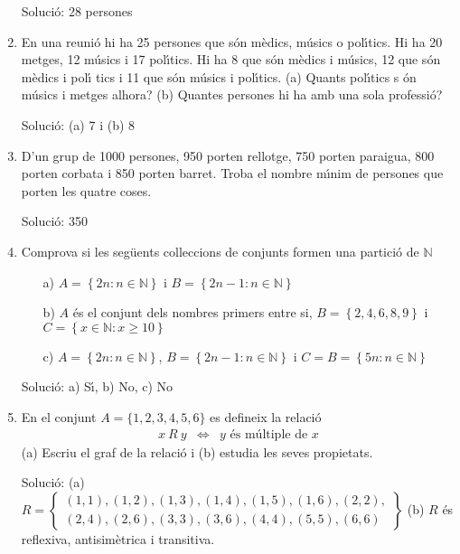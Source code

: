 \begin{enumerate}
Soluci\'{o}: 28 persones

\item En una reuni\'{o} hi ha 25 persones que s\'{o}n m\`{e}dics, m\'{u}sics
o pol\'{\i}tics. Hi ha 20 metges, 12 m\'{u}sics i 17 pol\'{\i}tics. Hi ha 8
que s\'{o}n m\`{e}dics i m\'{u}sics, 12 que s\'{o}n m\`{e}dics i pol\'{\i}%
tics i 11 que s\'{o}n m\'{u}sics i pol\'{\i}tics. (a) Quants pol\'{\i}tics s%
\'{o}n m\'{u}sics i metges alhora? (b) Quantes persones hi ha amb una sola
professi\'{o}?

Soluci\'{o}: (a) 7 i (b) 8

\item D'un grup de 1000 persones, 950 porten rellotge, 750 porten paraigua,
800 porten corbata i 850 porten barret. Troba el nombre m\'{\i}nim de
persones que porten les quatre coses.

Soluci\'{o}: 350

\item Comprova si les seg\"{u}ents col\textperiodcentered leccions de
conjunts formen una partici\'{o} de $\mathbb{N}$

\begin{enumerate}
\item[a)] $A=\left\{ 2n:n\in \mathbb{N}\right\} $ i $B=\left\{ 2n-1:n\in
\mathbb{N}\right\} $

\item[b)] $A$ \'{e}s el conjunt dels nombres primers entre si, $B=\left\{
2,4,6,8,9\right\} $ i $C=\left\{ x\in \mathbb{N}:x\geq 10\right\} $

\item[c)] $A=\left\{ 2n:n\in \mathbb{N}\right\} $, $B=\left\{ 2n-1:n\in
\mathbb{N}\right\} $ i $C=B=\left\{ 5n:n\in \mathbb{N}\right\} $
\end{enumerate}

Soluci\'{o}: a) S\'{\i}, b) No, c) No

\item En el conjunt $A=\{1,2,3,4,5,6\}$ es defineix la relaci\'{o}%
\begin{equation*}
\begin{array}{ccc}
x~R~y & \Longleftrightarrow & y\text{ \'{e}s m\'{u}ltiple de }x%
\end{array}%
\end{equation*}%
(a) Escriu el graf de la relaci\'{o} i (b) estudia les seves propietats.

Soluci\'{o}: (a) $R=\left\{
\begin{array}{c}
(1,1),(1,2),(1,3),(1,4),(1,5),(1,6),(2,2), \\
(2,4),(2,6),(3,3),(3,6),(4,4),(5,5),(6,6)%
\end{array}%
\right\} $ (b) $R$ \'{e}s reflexiva, antisim\`{e}trica i transitiva.


\end{enumerate}
